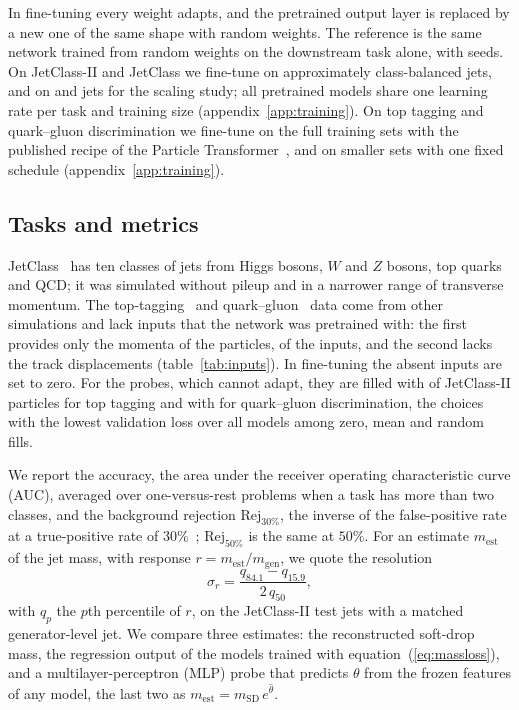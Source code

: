 In fine-tuning every weight adapts, and the pretrained output layer is replaced by a new one of the same shape with
random weights.
The reference is the same network trained from random weights on the downstream task alone, with \VScratchRunsWord{}
seeds.
On JetClass-II and JetClass we fine-tune on \FtSizeESix{} approximately class-balanced jets, and on \FtSizeEFour{} and
\FtSizeEFive{} jets for the scaling study; all pretrained models share one learning rate per task and training size
(appendix~\ref{app:training}).
On top tagging and quark--gluon discrimination we fine-tune on the full training sets with the published recipe of the
Particle Transformer~\cite{part}, and on smaller sets with one fixed schedule (appendix~\ref{app:training}).

\subsection{Tasks and metrics}\label{sec:tasks}
JetClass~\cite{part} has ten classes of jets from Higgs bosons, $W$ and $Z$ bosons, top quarks and QCD; it was
simulated without pileup and in a narrower range of transverse momentum.
The top-tagging~\cite{toptag,topdata} and quark--gluon~\cite{efn,qgpythia} data come from other simulations and lack
inputs that the network was pretrained with: the first provides only the momenta of the particles, \FillTopNPresent{}
of the \FillNFeatures{} inputs, and the second lacks the track displacements (table~\ref{tab:inputs}).
In fine-tuning the absent inputs are set to zero.
For the probes, which cannot adapt, they are filled with \LpSubstitutionTop{} of JetClass-II particles for top tagging
and with \LpSubstitutionQg{} for quark--gluon discrimination, the choices with the lowest validation loss over all models
among zero, mean and random fills.

We report the accuracy, the area under the receiver operating characteristic curve (AUC), averaged over
one-versus-rest problems when a task has more than two classes, and the background rejection $\mathrm{Rej}_{30\%}$,
the inverse of the false-positive rate at a true-positive rate of $30\%$~\cite{part}; $\mathrm{Rej}_{50\%}$ is the same
at $50\%$.
For an estimate $m_{\mathrm{est}}$ of the jet mass, with response $r = m_{\mathrm{est}}/m_{\mathrm{gen}}$, we quote the
resolution
\begin{equation}
  \sigma_r = \frac{q_{84.1} - q_{15.9}}{2\,q_{50}} ,
  \label{eq:resolution}
\end{equation}
with $q_p$ the $p$th percentile of $r$, on the JetClass-II test jets with a matched generator-level jet.
We compare three estimates: the reconstructed soft-drop mass, the regression output of the models trained with
equation~(\ref{eq:massloss}), and a multilayer-perceptron (MLP) probe that predicts $\theta$ from the frozen features of
any model, the last two as $m_{\mathrm{est}} = m_{\mathrm{SD}}\,e^{\hat\theta}$.

